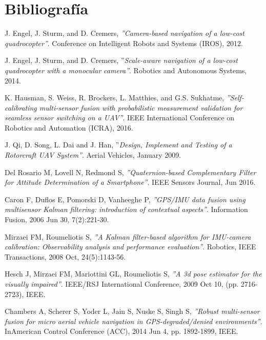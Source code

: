 \section{Bibliografía}
\label{sec:biblio}

\begin{thebibliography}{9}
    J. Engel, J. Sturm, and D. Cremers,
    \textit{''Camera-based navigation of a low-cost quadrocopter''}.
    Conference on Intelligent Robots and Systems (IROS),
    2012.
    
    J. Engel, J. Sturm, and D. Cremers,
    ''\textit{Scale-aware navigation of a low-cost quadrocopter with a monocular camera''}.
    Robotics and Autonomous Systems, 
    2014.

    K. Hausman, S. Weiss, R. Brockers, L. Matthies, and G.S. Sukhatme,
    \textit{''Self-calibrating multi-sensor fusion with probabilistic measurement validation for seamless sensor switching on a UAV''}.
    IEEE International Conference on Robotics and Automation (ICRA),
    2016.

    J. Qi, D. Song, L. Dai and J. Han,
    ''\textit{Design, Implement and Testing of a Rotorcraft UAV System''}.
    Aerial Vehicles, 
    January 2009.

    Del Rosario M, Lovell N, Redmond S,
    \textit{''Quaternion-based Complementary Filter for Attitude Determination of a Smartphone''}.
    IEEE Sensors Journal,
    Jun 2016.

    Caron F, Duflos E, Pomorski D, Vanheeghe P,
    \textit{''GPS/IMU data fusion using multisensor Kalman filtering: introduction of contextual aspects''}.
    Information Fusion,
    2006 Jun 30,
    7(2):221-30.
    
    Mirzaei FM, Roumeliotis S,
    \textit{''A Kalman filter-based algorithm for IMU-camera calibration: Observability analysis and performance evaluation''}.
    Robotics, IEEE Transactions,
    2008 Oct,
    24(5):1143-56.

    Hesch J, Mirzaei FM, Mariottini GL, Roumeliotis S,
    \textit{''A 3d pose estimator for the visually impaired''}.
    IEEE/RSJ International Conference,
    2009 Oct 10,
    (pp. 2716-2723),
    IEEE.
    
    Chambers A, Scherer S, Yoder L, Jain S, Nuske S, Singh S,
    \textit{''Robust multi-sensor fusion for micro aerial vehicle navigation in GPS-degraded/denied environments''}.
    InAmerican Control Conference (ACC),
    2014 Jun 4, 
    pp. 1892-1899, IEEE.


\end{thebibliography}

